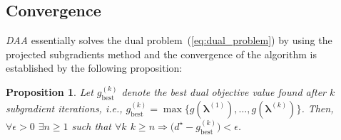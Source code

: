 \documentclass[journal, 10pt, twocolumn]{IEEEtran}
\newtheorem{prop}{Proposition}
\begin{document}
\subsection{Convergence}\label{subsec:Convergence}
\emph{DAA} essentially solves the dual problem~(\ref{eq:dual_problem}) by using the projected subgradients method and the convergence of the algorithm is established by the following proposition:
\begin{prop}\label{prop:convergence}
Let $g^{(k)}_{\mathrm{best}}$ denote the \emph{best} dual objective value found after $k$ subgradient iterations, i.e., $g^{(k)}_{\mathrm{best}}=\max\{g(\boldsymbol\lambda^{(1)}),\ldots,g(\boldsymbol\lambda^{(k)})\}$. Then, $\forall\epsilon>0$ $\exists n\geq 1$ such that $\forall k$ $k\geq n\Rightarrow \big(d^\star-g^{(k)}_{\mathrm{best}}\big)<\epsilon$.
\end{prop}
\end{document}
